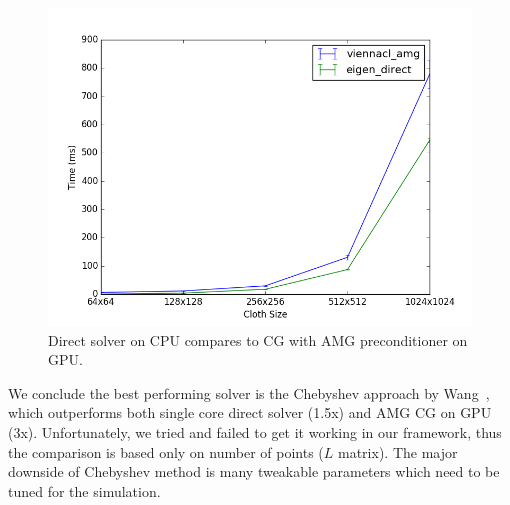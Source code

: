 \documentclass{article}
\begin{document}
\begin{figure}[htb!]
        \centering
        \includegraphics[width=0.9\linewidth]{img/amg_direct.png}
        \caption{Direct solver on CPU compares to CG with AMG preconditioner
                 on GPU. \label{fig:amg_direct}}
\end{figure}

We conclude the best performing solver is the Chebyshev approach by Wang~\cite{Wang15},
which outperforms both single core direct solver (1.5x) and AMG CG on GPU (3x).
Unfortunately, we tried and failed to get it working in our framework, thus
the comparison is based only on number of points ($L$ matrix). The major
downside of Chebyshev method is many tweakable parameters which need
to be tuned for the simulation.

{}

\end{document}
